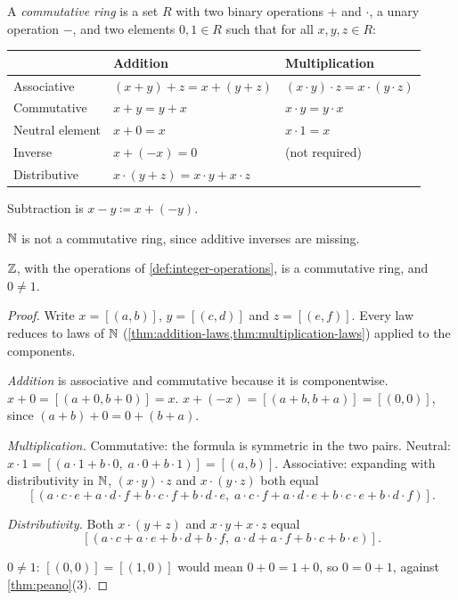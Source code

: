 \begin{definition}
\label{def:ring}
A \emph{commutative ring} is a set $R$ with two binary operations $+$ and $\cdot$,
a unary operation $-$, and two elements $0, 1 \in R$ such that for all $x, y, z
\in R$:
\begin{center}
\begin{tabular}{@{}lll@{}}
  \toprule
  & Addition & Multiplication \\
  \midrule
  Associative & $(x + y) + z = x + (y + z)$ & $(x \cdot y) \cdot z = x \cdot (y \cdot z)$ \\
  Commutative & $x + y = y + x$ & $x \cdot y = y \cdot x$ \\
  Neutral element & $x + 0 = x$ & $x \cdot 1 = x$ \\
  Inverse & $x + (-x) = 0$ & (not required) \\
  Distributive & \multicolumn{2}{l}{$x \cdot (y + z) = x \cdot y + x \cdot z$} \\
  \bottomrule
\end{tabular}
\end{center}
Subtraction is $x - y \coloneqq x + (-y)$.
\end{definition}

$\mathbb{N}$ is not a commutative ring, since additive inverses are missing.

\begin{theorem}
\label{thm:integers-ring}
$\mathbb{Z}$, with the operations of \cref{def:integer-operations}, is a commutative ring,
and $0 \neq 1$.
\end{theorem}

\begin{proof}
Write $x = [(a, b)]$, $y = [(c, d)]$ and $z = [(e, f)]$. Every law reduces to laws
of $\mathbb{N}$ (\cref{thm:addition-laws,thm:multiplication-laws}) applied to the
components.

\emph{Addition} is associative and commutative because it is componentwise. $x + 0
= [(a + 0, b + 0)] = x$. $x + (-x) = [(a + b, b + a)] = [(0, 0)]$, since $(a + b) +
0 = 0 + (b + a)$.

\emph{Multiplication.} Commutative: the formula is symmetric in the two pairs.
Neutral: $x \cdot 1 = [(a \cdot 1 + b \cdot 0,\; a \cdot 0 + b \cdot 1)] = [(a,
b)]$. Associative: expanding with distributivity in $\mathbb{N}$, $(x \cdot y) \cdot z$ and
$x \cdot (y \cdot z)$ both equal
\[
  [(a \cdot c \cdot e + a \cdot d \cdot f + b \cdot c \cdot f + b \cdot d \cdot
  e,\; a \cdot c \cdot f + a \cdot d \cdot e + b \cdot c \cdot e + b \cdot d \cdot
  f)].
\]

\emph{Distributivity.} Both $x \cdot (y + z)$ and $x \cdot y + x \cdot z$ equal
\[
  [(a \cdot c + a \cdot e + b \cdot d + b \cdot f,\; a \cdot d + a \cdot f + b
  \cdot c + b \cdot e)].
\]

$0 \neq 1$: $[(0, 0)] = [(1, 0)]$ would mean $0 + 0 = 1 + 0$, so $0 = 0 + 1$,
against \cref{thm:peano}(3).
\end{proof}

